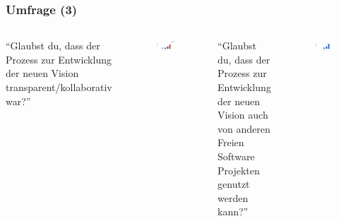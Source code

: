 \documentclass{beamer}
\begin{document}
\begin{frame}
\frametitle{Umfrage (3)}
\begin{columns}
   ``Glaubst du, dass der Prozess zur Entwicklung der neuen Vision transparent/kollaborativ war?''\newline
   \begin{figure}[h!]
    \centering
    \includegraphics[scale=0.25,keepaspectratio=true]{./amarok1ef.png}
   \end{figure}
   ``Glaubst du, dass der Prozess zur Entwicklung der neuen Vision auch von anderen Freien Software Projekten genutzt werden kann?''
   \begin{figure}[h!]
    \centering
    \includegraphics[scale=0.25,keepaspectratio=true]{./amarok1d.png}
   \end{figure}
\end{columns}
\end{frame}
\end{document}
